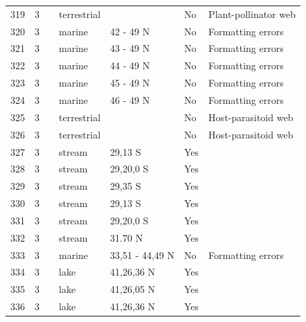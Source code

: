 \documentclass[12pt]{article}
\begin{document}
\begin{landscape}
\begin{table}[h!]
{\begin{tabular}{p{2.8cm}p{1.3cm}p{3cm}p{2.2cm}p{2.5cm}lp{8.2cm}}
        319   & 3 & \cite{Kaiser-Bunbury2011}  & terrestrial &       & No    & Plant-pollinator web \\
        320   & 3 & \cite{Ruzicka2012}    & marine & 42 - 49 N & No  &  Formatting errors     \\
        321   & 3 & \cite{Ruzicka2012}    & marine & 43 - 49 N & No  &  Formatting errors     \\
        322   & 3 & \cite{Ruzicka2012}    & marine & 44 - 49 N & No  &  Formatting errors     \\
        323   & 3 & \cite{Ruzicka2012}    & marine & 45 - 49 N & No  &  Formatting errors     \\
        324   & 3 & \cite{Ruzicka2012}    & marine & 46 - 49 N & No  &  Formatting errors     \\
        325   & 3 & \cite{Lewis2002}  & terrestrial &       & No    & Host-parasitoid web \\
        326   & 3 & \cite{Lewis2002}  & terrestrial &       & No    & Host-parasitoid web \\
        327   & 3 & \cite{Kelleway2010}  & stream & 29,13 S & Yes   &       \\
        328   & 3 & \cite{Kelleway2010}  & stream & 29,20,0 S & Yes   &       \\
        329   & 3 & \cite{Kelleway2010}  & stream & 29,35 S & Yes   &       \\
        330   & 3 & \cite{Kelleway2010}  & stream & 29,13 S & Yes   &       \\
        331   & 3 & \cite{Kelleway2010}  & stream & 29,20,0 S & Yes   &       \\
        332   & 3 & \cite{Huang2008}  & stream & 31.70 N & Yes   &       \\
        333   & 3 & \cite{Link2002}    & marine & 33,51 - 44,49 N & No  &  Formatting errors     \\
        334   & 3 & \cite{Alcorlo2001}  & lake  & 41,26,36 N & Yes   &       \\
        335   & 3 & \cite{Alcorlo2001}  & lake  & 41,26,05 N & Yes   &       \\
        336   & 3 & \cite{Alcorlo2001}  & lake  & 41,26,36 N & Yes   &       \\
         \hline
      \end{tabular}}%
      \end{table}

        \newpage


\end{landscape}
\end{document}
